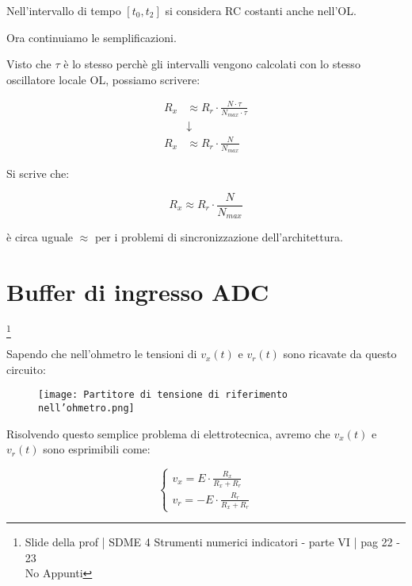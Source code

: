 Nell'intervallo di tempo $[t_0, t_2]$ si considera RC costanti anche nell'OL. \newline 

Ora continuiamo le semplificazioni. \newline 

Visto che $\tau$ è lo stesso perchè gli intervalli vengono calcolati con lo stesso oscillatore locale OL, 
possiamo scrivere: 


{
    \Large 
    \begin{equation}
        \begin{split}
        R_x 
        &\approx 
        R_r \cdot \frac{N \cdot \tau}{N_{max} \cdot \tau}
        \\
        &\downarrow
        \\
        R_x 
        &\approx 
        R_r \cdot \frac{N }{N_{max} }   
        \end{split}
    \end{equation}
}

Si scrive che:

{
    \Large 
    \begin{equation}
        R_x 
        \approx 
        R_r \cdot \frac{N }{N_{max} }  
    \end{equation}
}

è circa uguale $\approx$ per i problemi di sincronizzazione dell'architettura. \newline 

\newpage

\section{Buffer di ingresso ADC}
\footnote{Slide della prof | SDME 4 Strumenti numerici indicatori - parte VI | pag 22 - 23 \\  
No Appunti }

Sapendo che nell'ohmetro le tensioni di $v_x (t)$ e $v_r (t)$ sono ricavate da questo circuito: 

\begin{figure}[h]
    \centering
    \texttt{[image: Partitore di tensione di riferimento nell'ohmetro.png]}
\end{figure}

Risolvendo questo semplice problema di elettrotecnica, avremo che $v_x(t)$ e $v_r (t)$ sono esprimibili come:

{
    \Large 
    \begin{equation}
        \begin{cases}
            v_x = E \cdot \frac{R_x}{R_x + R_r} 
            \\
            v_r = - E \cdot \frac{R_r}{R_x + R_r} 
        \end{cases}
    \end{equation}
}

